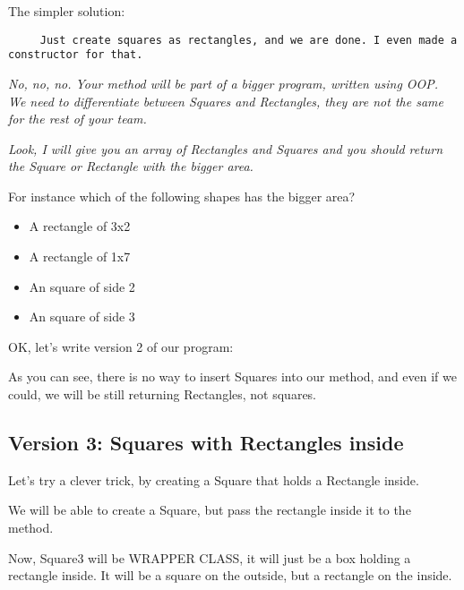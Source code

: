 \documentclass[a4paper, 9pt]{extarticle}
\begin{document}
The simpler solution:

\verb+     Just create squares as rectangles, and we are done. I even made a constructor for that.+

\textsl{No, no, no. Your method will be part of a bigger program, written using
OOP. We need to differentiate between Squares and Rectangles, they are not the
same for the rest of your team.}

\textsl{Look, I will give you an array of Rectangles and Squares and you should
return the Square or Rectangle with the bigger area.}

For instance which of the following shapes has the bigger area?

\begin{itemize}
  \item A rectangle of 3x2
  \item A rectangle of 1x7
  \item An square of side 2
  \item An square of side 3
\end{itemize}

OK, let's write version 2 of our program:

\begin{multicols}{2}
\columnbreak
\end{multicols}

As you can see, there is no way to insert Squares into our method, and even if
we could, we will be still returning Rectangles, not squares.

\subsection{Version 3: Squares with Rectangles inside}

Let's try a clever trick, by creating a Square that holds a Rectangle inside.

We will be able to create a Square, but pass the rectangle inside it to the
method.

Now, Square3 will be WRAPPER CLASS, it will just be a box holding a rectangle
inside. It will be a square on the outside, but a rectangle on the inside.

\begin{multicols}{2}
\columnbreak
\end{multicols}
\end{document}
